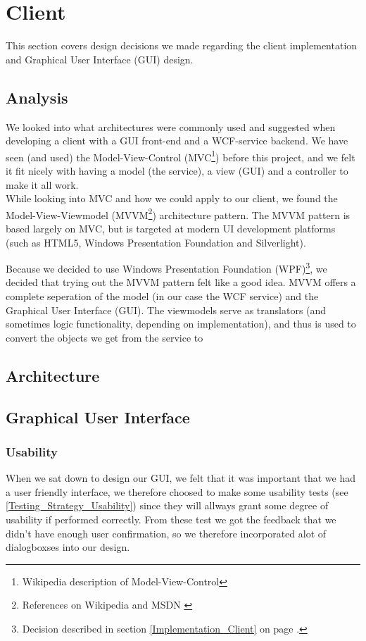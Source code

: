 \section{Client}
\label{Design_Client}
This section covers design decisions we made regarding the client implementation and Graphical User Interface (GUI) design.
\subsection{Analysis}
\label{Design_Client_Analysis}
We looked into what architectures were commonly used and suggested when developing a client with a GUI front-end and a WCF-service backend. We have seen (and used) the Model-View-Control (MVC\footnote{Wikipedia description of Model-View-Control\cite{WIKI-MVC}}) before this project, and we felt it fit nicely with having a model (the service), a view (GUI) and a controller to make it all work. 
\\While looking into MVC and how we could apply to our client, we found the Model-View-Viewmodel (MVVM\footnote{References on Wikipedia \cite{WIKI-MVVM} and MSDN \cite{MSDN-WPF-MVVM}}) architecture pattern. The MVVM pattern is based largely on MVC, but is targeted at modern UI development platforms (such as HTML5, Windows Presentation Foundation and Silverlight).

Because we decided to use Windows Presentation Foundation (WPF)\footnote{Decision described in section \ref{Implementation_Client} on page \pageref{Implementation_Client}.}, we decided that trying out the MVVM pattern felt like a good idea. MVVM offers a complete seperation of the model (in our case the WCF service) and the Graphical User Interface (GUI). The viewmodels serve as translators (and sometimes logic functionality, depending on implementation), and thus is used to convert the objects we get from the service to 
\subsection{Architecture}
\label{Design_Client_Architecture}

\subsection{Graphical User Interface}
\label{Design_Client_GUI}

\subsubsection{Usability}
\label{Design_Client_GUI_Usability}
When we sat down to design our GUI, we felt that it was important that we had a user friendly interface, we therefore choosed to make some usability tests (see \ref{Testing_Strategy_Usability}) since they will allways grant some degree of usability if performed correctly.
From these test we got the feedback that we didn't have enough user confirmation, so we therefore incorporated alot of dialogboxses into our design.

